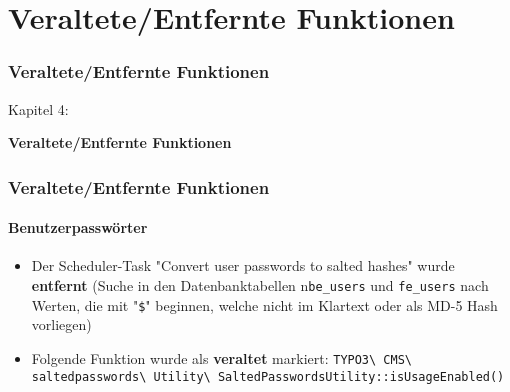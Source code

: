 %

\section{Veraltete/Entfernte Funktionen}
\begin{frame}[fragile]
	\frametitle{Veraltete/Entfernte Funktionen}

	\begin{center}\huge{Kapitel 4:}\end{center}
	\begin{center}\huge{\color{typo3darkgrey}\textbf{Veraltete/Entfernte Funktionen}}\end{center}

\end{frame}


\begin{frame}[fragile]
	\frametitle{Veraltete/Entfernte Funktionen}
	\framesubtitle{Benutzerpasswörter}

	\begin{itemize}
		\item Der Scheduler-Task "Convert user passwords to salted hashes"
			wurde \textbf{entfernt}\newline
			\smaller
				(Suche in den Datenbanktabellen n\texttt{be\_users} und \texttt{fe\_users} nach Werten,
				 die mit "\texttt{\$}" beginnen, welche nicht im Klartext
				oder als MD-5 Hash vorliegen)
			\normalsize
		\item Folgende Funktion wurde als \textbf{veraltet} markiert:\newline
			\fontsize{7.5pt}{10}\selectfont
				\texttt{TYPO3\textbackslash
					CMS\textbackslash
					saltedpasswords\textbackslash
					Utility\textbackslash
					SaltedPasswordsUtility::isUsageEnabled()}
			\normalsize

	\end{itemize}

\end{frame}

